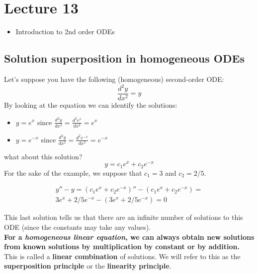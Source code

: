 \chapter*{Lecture 13}
\begin{recall}{}{}
\begin{itemize}
\item Introduction to 2nd order ODEs
\end{itemize}
\end{recall}





\section{Solution superposition in homogeneous ODEs}
Let's suppose you have the following (homogeneous) second-order ODE:
\begin{equation*}
\frac{d^2 y}{dx^2}=y
\end{equation*}
By looking at the equation we can identify the solutions:
\begin{itemize}
\item $y=e^x$ since $\frac{d^2 y}{dx^2}= \frac{d^2 e^x}{dx^2}=e^x$
\item $y=e^{-x}$ since $\frac{d^2 y}{dx^2}= \frac{d^2 e^{-x}}{dx^2}=e^{-x}$
\end{itemize} 
what about this solution?
\begin{equation*}
y=c_1 e^{x}+ c_2e^{-x}
\end{equation*}
For the sake of the example, we suppose that $c_1=3$ and $c_2=2/5$.

\begin{eqnarray*}
y''-y = (c_1 e^{x}+ c_2e^{-x})''- (c_1 e^{x}+ c_2e^{-x})=\\
3 e^{x} + 2/5e^{-x} - (3 e^{x}+ 2/5e^{-x})=0
\end{eqnarray*}


This last solution tells us that there are an infinite number of solutions to this ODE (since the constants may take any values).
\\
\textbf{For a \emph{homogeneous linear equation}, we can always obtain new solutions from known solutions by multiplication by constant or by addition.} \\

This is called a \textbf{linear combination} of solutions. We will refer to this as the  \textbf{superposition principle} or the \textbf{linearity principle}.\\

